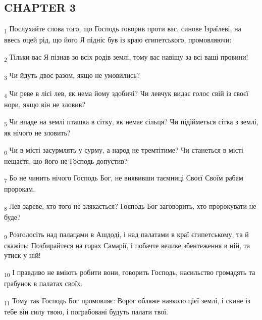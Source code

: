 \subsection{CHAPTER 3}
\begin{tcolorbox}
\textsubscript{1} Послухайте слова того, що Господь говорив проти вас, синове Ізраїлеві, на ввесь оцей рід, що його Я підніс був із краю єгипетського, промовляючи:
\end{tcolorbox}
\begin{tcolorbox}
\textsubscript{2} Тільки вас Я пізнав зо всіх родів землі, тому вас навіщу за всі ваші провини!
\end{tcolorbox}
\begin{tcolorbox}
\textsubscript{3} Чи йдуть двоє разом, якщо не умовились?
\end{tcolorbox}
\begin{tcolorbox}
\textsubscript{4} Чи реве в лісі лев, як нема йому здобичі? Чи левчук видає голос свій із своєї нори, якщо він не зловив?
\end{tcolorbox}
\begin{tcolorbox}
\textsubscript{5} Чи впаде на землі пташка в сітку, як немає сільця? Чи підійметься сітка з землі, як нічого не зловить?
\end{tcolorbox}
\begin{tcolorbox}
\textsubscript{6} Чи в місті засурмлять у сурму, а народ не тремтітиме? Чи станеться в місті нещастя, що його не Господь допустив?
\end{tcolorbox}
\begin{tcolorbox}
\textsubscript{7} Бо не чинить нічого Господь Бог, не виявивши таємниці Своєї Своїм рабам пророкам.
\end{tcolorbox}
\begin{tcolorbox}
\textsubscript{8} Лев зареве, хто того не злякається? Господь Бог заговорить, хто пророкувати не буде?
\end{tcolorbox}
\begin{tcolorbox}
\textsubscript{9} Розголосіть над палацами в Ашдоді, і над палатами в краї єгипетському, та й скажіть: Позбирайтеся на горах Самарії, і побачте велике збентеження в ній, та утиск у ній!
\end{tcolorbox}
\begin{tcolorbox}
\textsubscript{10} І правдиво не вміють робити вони, говорить Господь, насильство громадять та грабунок в палатах своїх.
\end{tcolorbox}
\begin{tcolorbox}
\textsubscript{11} Тому так Господь Бог промовляє: Ворог обляже навколо цієї землі, і скине із тебе він силу твою, і пограбовані будуть палати твої.
\end{tcolorbox}
